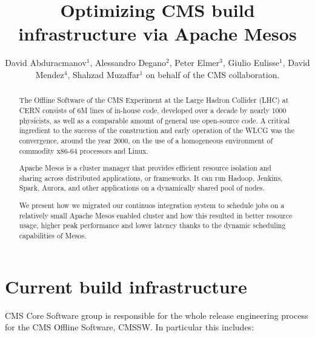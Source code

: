 \documentclass[a4paper]{jpconf}
\begin{document}

\title{Optimizing CMS build infrastructure via Apache Mesos}

\author{David Abduracmanov$^1$, Alessandro Degano$^2$, Peter Elmer$^3$, Giulio
Eulisse$^1$, David Mendez$^4$, Shahzad Muzaffar$^1$ on behalf of the CMS collaboration.}

\address{$^1$ Fermilab, Batavia, IL 60510, USA}
\address{$^2$ Università di Torino}
\address{$^3$ Department of Physics, Princeton University, Princeton, NJ 08540,
USA}
\address{$^4$ Universidad de los Andes, Bogotá, Colombia}



\begin{abstract}

The Offline Software of the CMS Experiment at the Large Hadron Collider (LHC) at
CERN consists of 6M lines of in-house code, developed over a decade by nearly
1000 physicists, as well as a comparable amount of general use open-source code.
A critical ingredient to the success of the construction and early operation of
the WLCG was the convergence, around the year 2000, on the use of a homogeneous
environment of commodity x86-64 processors and Linux.

Apache Mesos is a cluster manager that provides efficient resource isolation and
sharing across distributed applications, or frameworks. It can run Hadoop,
Jenkins, Spark, Aurora, and other applications on a dynamically shared pool of
nodes.

We present how we migrated our continuos integration system to schedule jobs on
a relatively small Apache Mesos enabled cluster and how this resulted in better
resource usage, higher peak performance and lower latency thanks to the dynamic
scheduling capabilities of Mesos.

\end{abstract}


\section{Current build infrastructure}

CMS Core Software group is responsible for the whole release engineering process
for the CMS Offline Software, CMSSW. In particular this includes:
\end{document}
